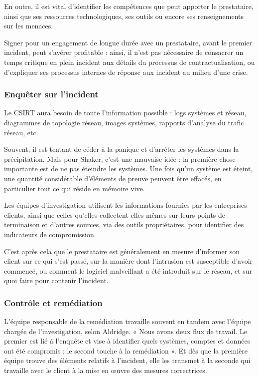 En outre, il est vital d’identifier les compétences que peut apporter le prestataire, ainsi que ses ressources technologiques, ses outils ou encore ses renseignements sur les menaces.

Signer pour un engagement de longue durée avec un prestataire, avant le premier incident, peut s’avérer profitable : ainsi, il n’est pas nécessaire de consacrer un temps critique en plein incident aux détails du processus de contractualisation, ou d’expliquer ses processus internes de réponse aux incident au milieu d’une crise. 

\subsubsection{Enquêter sur l’incident}

Le CSIRT aura besoin de toute l’information possible : logs systèmes et réseau, diagrammes de topologie réseau, images systèmes, rapports d’analyse du trafic réseau, etc.

Souvent, il est tentant de céder à la panique et d’arrêter les systèmes dans la précipitation. Mais pour Shaker, c’est une mauvaise idée :  la première chose importante est de ne pas éteindre les systèmes. Une fois qu’un système est éteint, une quantité considérable d’éléments de preuve peuvent être effacés, en particulier tout ce qui réside en mémoire vive.

Les équipes d’investigation utilisent les informations fournies par les entreprises clients, ainsi que celles qu’elles collectent elles-mêmes sur leurs points de terminaison et d’autres sources, via des outils propriétaires, pour identifier des indicateurs de compromission.

C’est après cela que le prestataire est généralement en mesure d’informer son client sur ce qui s’est passé, sur la manière dont l’intrusion est susceptible d’avoir commencé, ou comment le logiciel malveillant a été introduit sur le réseau, et sur quoi faire pour contenir l’incident.

\subsubsection{Contrôle et remédiation}

L’équipe responsable de la remédiation travaille souvent en tandem avec l’équipe chargée de l’investigation, selon Aldridge. « Nous avons deux flux de travail. Le premier est lié à l’enquête et vise à identifier quels systèmes, comptes et données ont été compromis ; le second touche à la remédiation ». Et dès que la première équipe trouve des éléments relatifs à l’incident, elle les transmet à la seconde qui travaille avec le client à la mise en œuvre des mesures correctrices.


